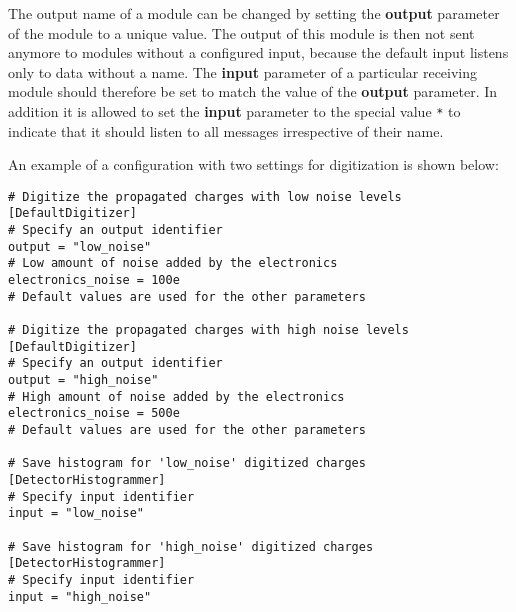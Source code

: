 The output name of a module can be changed by setting the \textbf{output} parameter of the module to a unique value. The output of this module is then not sent anymore to modules without a configured input, because the default input listens only to data without a name. The \textbf{input} parameter of a particular receiving module should therefore be set to match the value of the \textbf{output} parameter. In addition it is allowed to set the \textbf{input} parameter to the special value \texttt{*} to indicate that it should listen to all messages irrespective of their name.

An example of a configuration with two settings for digitization is shown below:
\begin{verbatim}
# Digitize the propagated charges with low noise levels
[DefaultDigitizer]
# Specify an output identifier 
output = "low_noise"
# Low amount of noise added by the electronics
electronics_noise = 100e
# Default values are used for the other parameters

# Digitize the propagated charges with high noise levels
[DefaultDigitizer]
# Specify an output identifier
output = "high_noise"
# High amount of noise added by the electronics
electronics_noise = 500e
# Default values are used for the other parameters

# Save histogram for 'low_noise' digitized charges
[DetectorHistogrammer]
# Specify input identifier 
input = "low_noise"

# Save histogram for 'high_noise' digitized charges
[DetectorHistogrammer]
# Specify input identifier 
input = "high_noise"
\end{verbatim}


